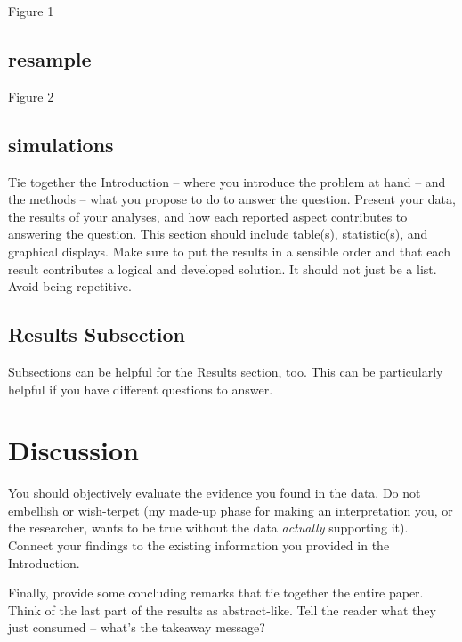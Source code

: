 \documentclass{article}\usepackage[]{graphicx}\usepackage[]{xcolor}
\makeatletter
\newenvironment{kframe}{%
 \def\at@end@of@kframe{}%
 \ifinner\ifhmode%
  \def\at@end@of@kframe{\end{minipage}}%
  \begin{minipage}{\columnwidth}%
 \fi\fi%
 \def\FrameCommand##1{\hskip\@totalleftmargin \hskip-\fboxsep
 \colorbox{shadecolor}{##1}\hskip-\fboxsep
     \hskip-\linewidth \hskip-\@totalleftmargin \hskip\columnwidth}%
 \MakeFramed {\advance\hsize-\width
   \@totalleftmargin\z@ \linewidth\hsize
   \@setminipage}}%
 {\par\unskip\endMakeFramed%
 \at@end@of@kframe}
\makeatother
\begin{document}
\begin{multicols}{2}
Figure 1

\subsection{resample}
\begin{kframe}


{\ttfamily\noindent\bfseries{}}\end{kframe}
Figure 2

\subsection{simulations}

Tie together the Introduction -- where you introduce the problem at hand -- and the methods --  what you propose to do to answer the question. Present your data, the results of your analyses, and how each reported aspect contributes to answering the question. This section should include table(s), statistic(s), and graphical displays. Make sure to put the results in a sensible order and that each result contributes a logical and developed solution. It should not just be a list. Avoid being repetitive. 

\subsection{Results Subsection}
Subsections can be helpful for the Results section, too. This can be particularly helpful if you have different questions to answer. 


\section{Discussion}
 You should objectively evaluate the evidence you found in the data. Do not embellish or wish-terpet (my made-up phase for making an interpretation you, or the researcher, wants to be true without the data \emph{actually} supporting it). Connect your findings to the existing information you provided in the Introduction.

Finally, provide some concluding remarks that tie together the entire paper. Think of the last part of the results as abstract-like. Tell the reader what they just consumed -- what's the takeaway message?


\end{multicols}
\end{document}

